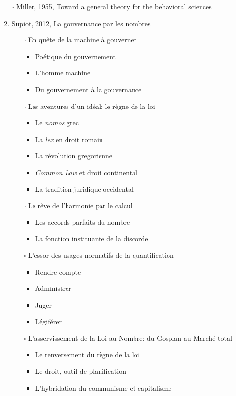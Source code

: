 \documentclass[paper=B6,portrait,twoside=true,twocolumn=false,headinclude=true,footinclude=false,fontsize=12,BCOR=10mm,DIV=calc,pagesize=auto,titlepage=firstiscover,mpinclude=false,headings=normal,headings=twolinechapter,open=right,toc=graduated,chapterprefix=false,numbers=endperiod,parskip=half+]{scrbook}
\theoremstyle{definition}
\begin{document}
\begin{enumerate}
\begin{itemize}
\end{itemize}
\item[{$\square$}] Miller, 1955, Toward a general theory for the behavioral sciences
\item\relax [0/10] Supiot, 2012, La gouvernance par les nombres
\begin{itemize}
\item[{$\square$}] En quête de la machine à gouverner
\begin{itemize}
\item Poétique du gouvernement
\item L'homme machine
\item Du gouvernement à la gouvernance
\end{itemize}
\item[{$\square$}] Les aventures d'un idéal: le règne de la loi
\begin{itemize}
\item Le \emph{nomos} grec
\item La \emph{lex} en droit romain
\item La révolution gregorienne
\item \emph{Common Law} et droit continental
\item La tradition juridique occidental
\end{itemize}
\item[{$\square$}] Le rêve de l'harmonie par le calcul
\begin{itemize}
\item Les accords parfaits du nombre
\item La fonction instituante de la discorde
\end{itemize}
\item[{$\square$}] L'essor des usages normatifs de la quantification
\begin{itemize}
\item Rendre compte
\item Administrer
\item Juger
\item Légiférer
\end{itemize}
\item[{$\square$}] L’asservissement de la Loi au Nombre: du Gosplan au Marché total
\begin{itemize}
\item Le renversement du règne de la loi
\item Le droit, outil de planification
\item L'hybridation du communisme et capitalisme
\end{itemize}

\end{itemize}
\end{enumerate}
\end{document}
